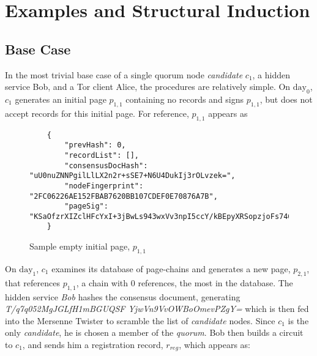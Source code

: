 
\section{Examples and Structural Induction}

\subsection{Base Case}

In the most trivial base case of a single quorum node \emph{candidate} $ c_{1} $, a hidden service Bob, and a Tor client Alice, the procedures are relatively simple. On $ \textrm{day}_{0} $, $ c_{1} $ generates an initial page $ p_{1,1} $ containing no records and signs $ p_{1,1} $, but does not accept records for this initial page. For reference, $ p_{1,1} $ appears as 

\begin{figure}
\begin{lstlisting}
	{
		"prevHash": 0,
		"recordList": [],
		"consensusDocHash": "uU0nuZNNPgilLlLX2n2r+sSE7+N6U4DukIj3rOLvzek=",
		"nodeFingerprint": "2FC06226AE152FBAB7620BB107CDEF0E70876A7B",
		"pageSig": "KSaOfzrXIZclHFcYxI+3jBwLs943wxVv3npI5ccY/kBEpyXRSopzjoFs746n0tJqUpdY4Kbe6DBwERaN7ELmSSK9Pu6q8QeKzNAh+QOnKl0fKBN7fqowjkQ3ktFkR0Vuox9WrrbNTMa4+up0Np52hlbKA3zSRz4fbR9NVlh6uuQ="
	}
\end{lstlisting}
\caption{Sample empty initial page, $ p_{1,1} $}
\label{sampleLabel}
\end{figure}

On $ \textrm{day}_{1} $, $ c_{1} $ examines its database of page-chains and generates a new page, $ p_{2,1} $, that references $ p_{1,1} $, a chain with 0 references, the most in the database. The hidden service \emph{Bob} hashes the consensus document, generating \emph{T/q7q052MgJGLfH1mBGUQSF YjwVn9VvOWBoOmevPZgY=} which is then fed into the Mersenne Twister to scramble the list of \emph{candidate} nodes. Since $ c_{1} $ is the only \emph{candidate}, he is chosen a member of the \emph{quorum}. Bob then builds a circuit to $ c_{1} $, and sends him a registration record, $ r_{reg} $, which appears as:

